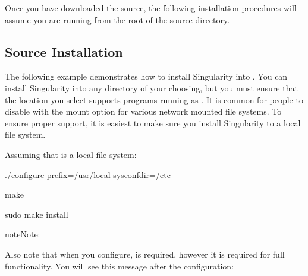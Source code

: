 \documentclass[letterpaper,10pt,english]{sphinxmanual}
\begin{document}
Once you have downloaded the source, the following installation
procedures will assume you are running from the root of the source
directory.


\subsection{Source Installation}
\label{\detokenize{admin_quickstart:source-installation}}
The following example demonstrates how to install Singularity into .
You can install Singularity into any directory of your choosing, but
you must ensure that the location you select supports programs running
as . It is common for people to disable  with the mount option  for
various network mounted file systems. To ensure proper support, it is
easiest to make sure you install Singularity to a local file system.

Assuming that  is a local file system:

%
\begin{sphinxVerbatim}[commandchars=\\\{\}]
\PYGZdl{} ./configure \PYGZhy{}\PYGZhy{}prefix=/usr/local \PYGZhy{}\PYGZhy{}sysconfdir=/etc

\PYGZdl{} make

\PYGZdl{} sudo make install
\end{sphinxVerbatim}

\begin{sphinxadmonition}{note}{Note:}
  
\end{sphinxadmonition}

Also note that when you configure,  is  required, however it is
required for full functionality. You will see this message after the
configuration:

%
\begin{sphinxVerbatim}[commandchars=\\\{\}]
       
\end{sphinxVerbatim}
\end{document}
